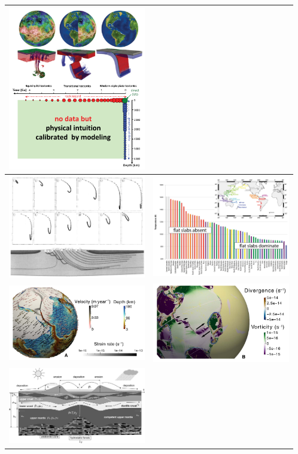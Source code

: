 \begin{tabular}{p{8cm}p{8cm}}
\includegraphics[width=6cm]{images/beautiful/gery19} \cite{gery19}\\ \hline
\includegraphics[width=6cm]{images/beautiful/babr97} \cite{babr97} & 
\includegraphics[width=6cm]{images/beautiful/kifr15} \cite{kifr15}  \\ \hline
\includegraphics[width=6cm]{images/beautiful/cohf19a} &
\includegraphics[width=6cm]{images/beautiful/cohf19b} \cite{cohf19}  \\ \hline
\includegraphics[width=6cm]{images/beautiful/bucl97} &
\end{tabular}



